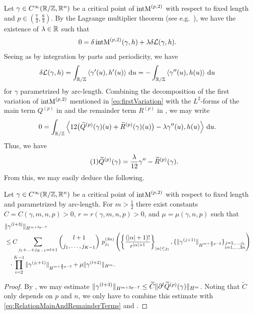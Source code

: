 Let  $\gamma\in C^\infty(\mathbb{R}/\mathbb{Z},\mathbb{R}^n)$ be  a critical point of $\operatorname{intM}^{\left(p,2\right)}$ with respect to fixed length and $p\in(\tfrac 73,\tfrac 83)$.
By the Lagrange multiplier theorem (see e.g.\ \cite[§9.3~Theorem 1]{Luenberger:1998:OptimizationVectorSpace}), we have the existence of $\lambda \in \mathbb{R}$ such that
\[
0 = \delta\operatorname{intM}^{\left(p,2\right)}(\gamma,h) + \lambda \delta \mathcal{L}(\gamma,h).
\]
Seeing as by integration by parts and periodicity, we have
\[
\delta\mathcal{L}(\gamma,h) = \int_{\mathbb{R}/\mathbb{Z}} \left<\gamma'(u),h'(u)\right> \,\mathrm{d} u = - \int_{\mathbb{R}/\mathbb{Z}} \left<\gamma''(u),h(u)\right> \,\mathrm{d} u
\]
for $\gamma$ parametrized by arc-length.
Combining the decomposition of the first variation of $\operatorname{intM}^{\left(p,2\right)}$ mentioned in \eqref{eq:firstVariation} with the $L^2$-forms of the main term $Q^{(p)}$ in  and the remainder term $R^{(p)}$ in , we may write
\[
0 =  \int_{\mathbb{R}/\mathbb{Z}} \left<12 \bigl(\widetilde Q^{(p)}(\gamma)(u) + \widetilde R^{(p)}(\gamma)(u)\bigr) - \lambda \gamma''(u), h(u)\right> \,\mathrm{d} u.
\]
Thus, we have
\[
\label{eq:RelationMainAndRemainderTerms}
\numberthis
\Qpt(\gamma) = \frac {\lambda} {12} \gamma'' - \Rpt(\gamma).
\]
From this, we may easily deduce the following.
\begin{corollary}
	\label{cor:estimateMainTermViaRemainder}
	Let $\gamma \in C^\infty(\mathbb{R}/\mathbb{Z},\mathbb{R}^n)$ be a critical point of $\operatorname{intM}^{\left(p,2\right)}$ with respect to fixed length and parametrized by arc-length.
	For $m>\frac 1 2$ there exist constants 
	$C=C(\gamma,m,n,p)>0$, $r=r(\gamma,m,n,p)>0$, and $\mu=\mu(\gamma, n,p)$ such that
	\[
	\begin{split}
	&\norm[H^{m+3p-7}]{\gamma^{(l+3)}}\\
	&\le C \sum_{j_1 + \ldots + j_{K-1} = l+1} \binom{l+1}{j_1, \ldots, j_{K-1}} \ p^{(3n)}_{j_1} \left( \left\{\frac{(|\alpha|+1)!}{r^{|\alpha|+1}} \right\}_{|\alpha|\leq j_1}, \{ \| \gamma^{(j+1)} \|_{H^{m+ \frac 32 p -3}}\}_{\substack{j =1, \ldots, j_1\\ i = 1, \ldots, 3n}} \right) \\
	& \phantom{\le} \cdot \prod_{i=2}^{K-1} {\|\gamma^{(j_i+1)}\|_{H^{m+ \frac 32 p -3}}} + \mu \norm[H^m]{\gamma^{(l+2)}}.
	\end{split}
	\]
\end{corollary}
\begin{proof}
	By , we may estimate $\norm[H^{m+3p-7}]{\gamma^{(l+3)}} \le \widetilde C \norm[H^m]{\partial^l\Qpt(\gamma)}$.
	Noting that $\widetilde C$ only depends on $p$ and $n$, we only have to combine this estimate with \eqref{eq:RelationMainAndRemainderTerms} and . 
\end{proof}

